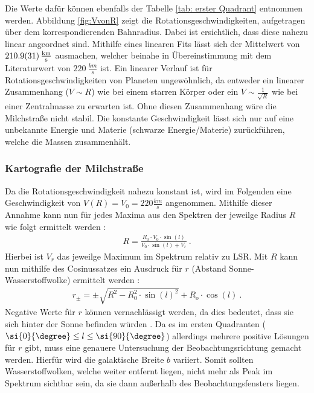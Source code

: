 Die Werte dafür können ebenfalls der Tabelle \ref{tab: erster Quadrant} entnommen werden. Abbildung \ref{fig:VvonR} zeigt die Rotationsgeschwindigkeiten, aufgetragen über dem korrespondierenden Bahnradius. Dabei ist ersichtlich, dass diese nahezu linear angeordnet sind. Mithilfe eines linearen Fits lässt sich der Mittelwert von $\SI{210.9 \pm 3.1}{\frac{km}{s}}$ ausmachen, welcher beinahe in Übereinstimmung mit dem Literaturwert von $\SI{220}{\frac{km}{s}}$ \cite{LSR} ist. Ein linearer Verlauf ist für Rotationsgeschwindigkeiten von Planeten ungewöhnlich, da entweder ein linearer Zusammenhang ($V \sim R$) wie bei einem starren Körper oder ein $V \sim\frac{1}{\sqrt{R}}$ wie bei einer Zentralmasse zu erwarten ist. Ohne diesen Zusammenhang wäre die Milchstraße nicht stabil. Die konstante Geschwindigkeit lässt sich nur auf eine unbekannte Energie und Materie (schwarze  Energie/Materie) zurückführen, welche die Massen zusammenhält.

\subsubsection{Kartografie der Milchstraße}
Da die Rotationsgeschwindigkeit nahezu konstant ist, wird im Folgenden eine Geschwindigkeit von $V(R) = V_0 = \si{220}{\frac{km}{s}}$ angenommen. Mithilfe dieser Annahme kann nun für jedes Maxima aus den Spektren der jeweilge Radius $R$ wie folgt ermittelt werden \cite{H1}:
\begin{align}
    R =\frac{R_0 \cdot V_0 \cdot \sin(l)}{V_0 \cdot \sin(l) + V_r} \ .
    \label{eq:BerechnungR}
\end{align}
Hierbei ist $V_r$ das jeweilge Maximum im Spektrum relativ zu LSR.\newline
Mit $R$ kann nun mithilfe des Cosinussatzes ein Ausdruck für $r$ (Abstand Sonne-Wasserstoffwolke) ermittelt werden \cite{H1}:
\begin{align}
    r_{\pm} = \pm \sqrt{R^2 - R_0^2 \cdot \sin(l)^2} + R_o \cdot \cos(l) \ .
    \label{eq:Berechnungr}
\end{align}
Negative Werte für $r$ können vernachlässigt werden, da dies bedeutet, dass sie sich hinter der Sonne befinden würden \cite{H1}. Da es im ersten Quadranten ($ \si{0}{\degree} \le l \le \si{90}{\degree}$) allerdings mehrere positive Lösungen für $r$ gibt, muss eine genauere Untersuchung der Beobachtungsrichtung gemacht werden. 
Hierfür wird die galaktische Breite $b$ variiert. Somit sollten Wasserstoffwolken, welche weiter entfernt liegen, nicht mehr als Peak im Spektrum sichtbar sein, da sie dann außerhalb des Beobachtungsfensters liegen. 

